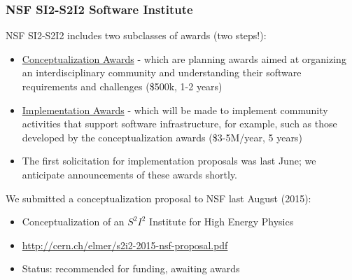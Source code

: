 \begin{frame}
\frametitle{NSF SI2-S2I2 Software Institute}

NSF SI2-S2I2 includes two subclasses of awards (two steps!):
\begin{itemize}
\item \underline{Conceptualization Awards} - which are planning awards aimed at organizing an interdisciplinary community and understanding their software requirements and challenges (\$500k, 1-2 years)
\item \underline{Implementation Awards} - which will be made to implement community activities that support software infrastructure, for example, such as those developed by the conceptualization awards (\$3-5M/year, 5 years)
\item The first solicitation for implementation proposals was last June; we anticipate announcements of these awards shortly.
\end{itemize}

We submitted a conceptualization proposal to NSF last August (2015):
\begin{itemize}
\item Conceptualization of an $ S^2 I^2 $ Institute for High Energy Physics
\item \url{http://cern.ch/elmer/s2i2-2015-nsf-proposal.pdf}
\item Status: recommended for funding, awaiting awards
\end{itemize}

\end{frame}



